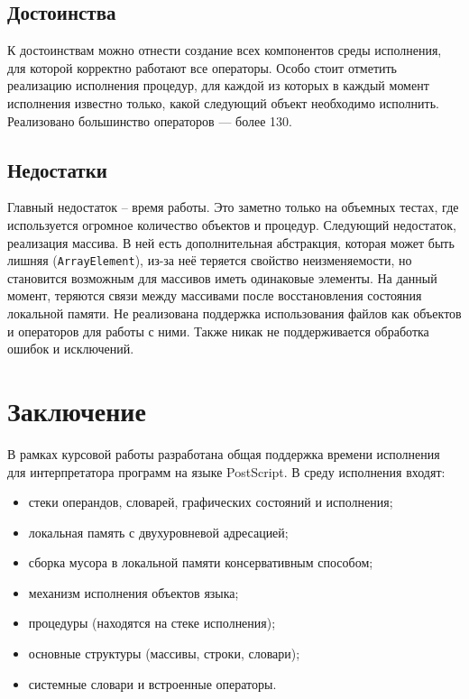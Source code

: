 \subsection{Достоинства}
К достоинствам можно отнести создание всех компонентов среды исполнения, для которой корректно работают все операторы. Особо стоит отметить реализацию исполнения процедур, для каждой из которых в каждый момент исполнения известно только, какой следующий объект необходимо исполнить. Реализовано большинство операторов  --- более 130.

\subsection{Недостатки}
Главный недостаток -- время работы. Это заметно только на объемных тестах, где используется огромное количество объектов и процедур. Следующий недостаток, реализация массива. В ней есть дополнительная абстракция, которая может быть лишняя (\texttt{ArrayElement}), из-за неё теряется свойство неизменяемости, но становится возможным для массивов иметь одинаковые элементы. На данный момент, теряются связи между массивами после восстановления состояния локальной памяти. Не реализована поддержка использования файлов как объектов и операторов для работы с ними. Также никак не поддерживается обработка ошибок и исключений.

\section*{Заключение}

В рамках курсовой работы разработана общая поддержка времени исполнения для интерпретатора программ на языке PostScript.
В среду исполнения входят:
\begin{itemize}
\item стеки операндов, словарей, графических состояний и исполнения;
\item локальная память с двухуровневой адресацией;
\item сборка мусора в локальной памяти консервативным способом;
\item механизм исполнения объектов языка;
\item процедуры (находятся на стеке исполнения);
\item основные структуры (массивы, строки, словари);
\item системные словари и встроенные операторы.
\end{itemize}

